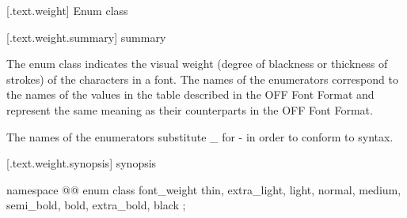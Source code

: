 
 [\iotwod.text.weight] {Enum class }

 [\iotwod.text.weight.summary] { summary}

\pnum
The  enum class indicates the visual weight (degree of blackness or thickness of strokes) of the characters in a font. The names of the enumerators correspond to the names of the  values in the  table described in the OFF Font Format and represent the same meaning as their counterparts in the OFF Font Format.

\pnum
The names of the enumerators substitute _ for - in order to conform to \Cpp{} syntax.

 [\iotwod.text.weight.synopsis] { synopsis}

\begin{codeblock}
namespace @\fullnamespace{}@ {
  enum class font_weight {
    thin,
    extra_light,
    light,
    normal,
    medium,
    semi_bold,
    bold,
    extra_bold,
    black
  };
}
\end{codeblock}
